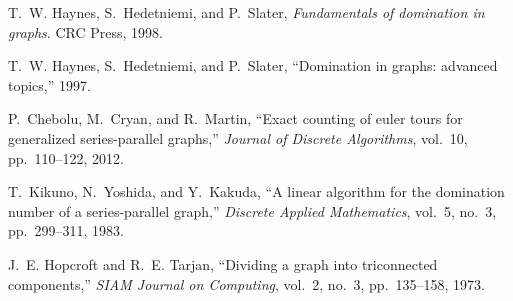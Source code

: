 \documentclass[12pt]{article}
\theoremstyle{definition}
\theoremstyle{remark}
\begin{document}
\begin{thebibliography}{10}
	T.~W. Haynes, S.~Hedetniemi, and P.~Slater, {\em Fundamentals of domination in
		graphs}.
	\newblock CRC Press, 1998.
	
	T.~W. Haynes, S.~Hedetniemi, and P.~Slater, ``Domination in graphs: advanced
	topics,'' 1997.
	
	P.~Chebolu, M.~Cryan, and R.~Martin, ``Exact counting of euler tours for
	generalized series-parallel graphs,'' {\em Journal of Discrete Algorithms},
	vol.~10, pp.~110--122, 2012.
	
	T.~Kikuno, N.~Yoshida, and Y.~Kakuda, ``A linear algorithm for the domination
	number of a series-parallel graph,'' {\em Discrete Applied Mathematics},
	vol.~5, no.~3, pp.~299--311, 1983.
	
	J.~E. Hopcroft and R.~E. Tarjan, ``Dividing a graph into triconnected
	components,'' {\em SIAM Journal on Computing}, vol.~2, no.~3, pp.~135--158,
	1973.
	
\end{thebibliography}
\end{document}
